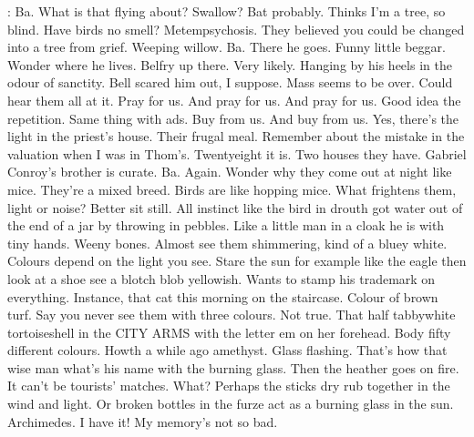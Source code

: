 \Bloom:
Ba. What is that flying about? Swallow? Bat probably. Thinks I'm a tree,
so blind. Have birds no smell? Metempsychosis. They believed you could be
changed into a tree from grief. Weeping willow. Ba. There he goes.
Funny little beggar. Wonder where he lives. Belfry up there. Very likely.
Hanging by his heels in the odour of sanctity. Bell scared him out, I
suppose. Mass seems to be over. Could hear them all at it. Pray for us.
And pray for us. And pray for us. Good idea the repetition. Same
thing with ads. Buy from us. And buy from us. Yes, there's the light
in the priest's house. Their frugal meal. Remember about the mistake
in the valuation when I was in Thom's. Twentyeight it is. Two houses
they have. Gabriel Conroy's brother is curate. Ba. Again. Wonder why
they come out at night like mice. They're a mixed breed. Birds are
like hopping mice. What frightens them, light or noise? Better sit still.
All instinct like the bird in drouth got water out of the end of a
jar by throwing in pebbles. Like a little man in a cloak he is with tiny
hands. Weeny bones. Almost see them shimmering, kind of a bluey white.
Colours depend on the light you see. Stare the sun for example
like the eagle then look at a shoe see a blotch blob yellowish. Wants to
stamp his trademark on everything. Instance, that cat this morning on the
staircase. Colour of brown turf. Say you never see them with three
colours. Not true. That half tabbywhite tortoiseshell in the CITY ARMS
with the letter em on her forehead. Body fifty different colours. Howth
a while ago amethyst. Glass flashing. That's how that wise man what's his
name with the burning glass. Then the heather goes on fire. It can't be
tourists' matches. What? Perhaps the sticks dry rub together in the wind
and light. Or broken bottles in the furze act as a burning glass in the
sun. Archimedes. I have it! My memory's not so bad.

